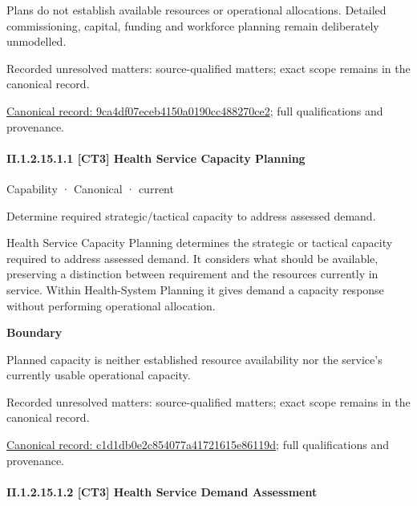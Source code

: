 Plans do not establish available resources or operational allocations. Detailed commissioning, capital, funding and workforce planning remain deliberately unmodelled.


{\small Recorded unresolved matters: source-qualified matters; exact scope remains in the canonical record.}\par
{\footnotesize \href{../../../../../../../continuum/strategy/capability/9ca4df07eceb4150a0190cc488270ce2.md}{Canonical record: 9ca4df07eceb4150a0190cc488270ce2}; full qualifications and provenance.}\par
\paragraph*{II.1.2.15.1.1 [CT3] Health Service Capacity Planning}
\label{navigation:II.1.2.15.1.1}

\label{element:c1d1db0e2c854077a41721615e86119d}
{\small Capability · Canonical · current}\par

Determine required strategic/tactical capacity to address assessed demand.



Health Service Capacity Planning determines the strategic or tactical capacity required to address assessed demand. It considers what should be available, preserving a distinction between requirement and the resources currently in service. Within Health-System Planning it gives demand a capacity response without performing operational allocation.



\textbf{Boundary}



Planned capacity is neither established resource availability nor the service's currently usable operational capacity.


{\small Recorded unresolved matters: source-qualified matters; exact scope remains in the canonical record.}\par
{\footnotesize \href{../../../../../../../continuum/strategy/capability/c1d1db0e2c854077a41721615e86119d.md}{Canonical record: c1d1db0e2c854077a41721615e86119d}; full qualifications and provenance.}\par
\paragraph*{II.1.2.15.1.2 [CT3] Health Service Demand Assessment}
\label{navigation:II.1.2.15.1.2}

